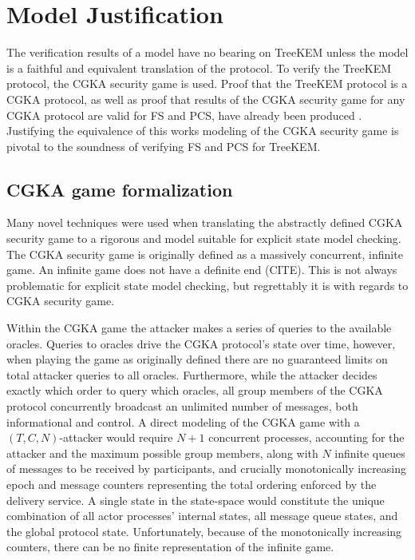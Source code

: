 \hypertarget{sec:justification}{%
\chapter{Model Justification}\label{sec:justification}}

The verification results of a model have no bearing on TreeKEM unless the model is a faithful and equivalent translation of the protocol.
To verify the TreeKEM protocol, the CGKA security game is used.
Proof that the TreeKEM protocol is a CGKA protocol, as well as proof that results of the CGKA security game for any CGKA protocol are valid for FS and PCS, have already been produced \autocite{alwen2020security}.
Justifying the equivalence of this works modeling of the CGKA security game is pivotal to the soundness of verifying FS and PCS for TreeKEM.

\hypertarget{sec:game-adaptations}{%
\section{CGKA game formalization}\label{sec:game-adaptations}}

Many novel techniques were used when translating the abstractly defined CGKA security game to a rigorous and model suitable for explicit state model checking.
The CGKA security game is originally defined as a massively concurrent, infinite game.
An infinite game does not have a definite end (CITE).
This is not always problematic for explicit state model checking, but regrettably it is with regards to CGKA security game.

Within the CGKA game the attacker makes a series of queries to the available oracles.
Queries to oracles drive the CGKA protocol's state over time, however, when playing the game as originally defined there are no guaranteed limits on total attacker queries to all oracles.
Furthermore, while the attacker decides exactly which order to query which oracles, all group members of the CGKA protocol concurrently broadcast an unlimited number of messages, both informational and control.
A direct modeling of the CGKA game with a \((T, C, N)\)-attacker would require \(N+1\) concurrent processes, accounting for the attacker and the maximum possible group members, along with \(N\) infinite queues of messages to be received by participants, and crucially monotonically increasing epoch and message counters representing the total ordering enforced by the delivery service.
A single state in the state-space would constitute the unique combination of all actor processes' internal states, all message queue states, and the global protocol state.
Unfortunately, because of the monotonically increasing counters, there can be no finite representation of the infinite game.


